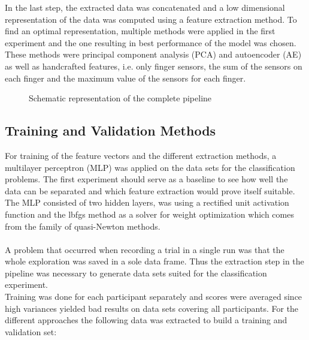 In the last step, the extracted data was concatenated and a low dimensional representation of the data was computed using a feature extraction method. To find an optimal representation, multiple methods were applied in the first experiment and the one resulting in best performance of the model was chosen. These methods were principal component analysis (PCA) and autoencoder (AE) as well as handcrafted features, i.e. only finger sensors, the sum of the sensors on each finger and the maximum value of the sensors for each finger.

\begin{figure}[h]
	\caption{Schematic representation of the complete pipeline}
	\label{pipeline}
\end{figure}

\subsection{Training and Validation Methods}
For training of the feature vectors and the different extraction methods, a multilayer perceptron (MLP) was applied on the data sets for the classification problems. The first experiment should serve as a baseline to see how well the data can be separated and which feature extraction would prove itself suitable. The MLP consisted of two hidden layers, was using a rectified unit activation function and the lbfgs method as a solver for weight optimization which comes from the family of quasi-Newton methods.\\
\\
A problem that occurred when recording a trial in a single run was that the whole exploration was saved in a sole data frame. Thus the extraction step in the pipeline was necessary to generate data sets suited for the classification experiment.\\
Training was done for each participant separately and scores were averaged since high variances yielded bad results on data sets covering all participants. For the different approaches the following data was extracted to build a training and validation set:

